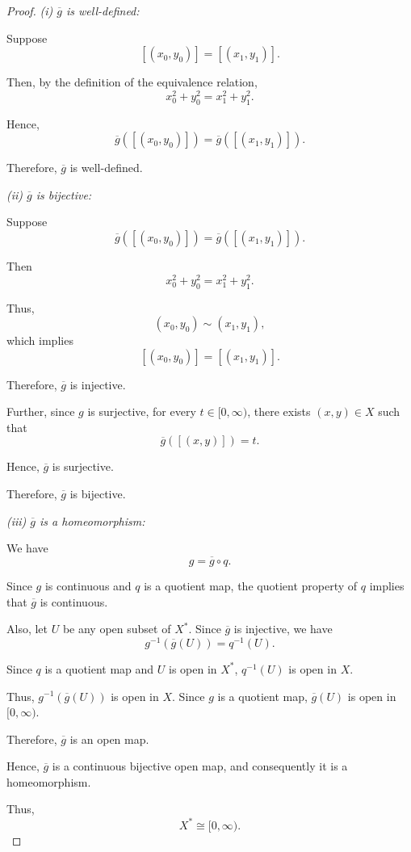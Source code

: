\begin{proof}
\textit{(i) \(\overline{g}\) is well-defined:}

Suppose
\[
[(x_0,y_0)]=[(x_1,y_1)].
\]

Then, by the definition of the equivalence relation,
\[
x_0^2+y_0^2=x_1^2+y_1^2.
\]

Hence,
\[
\overline{g}([(x_0,y_0)])
=
\overline{g}([(x_1,y_1)]).
\]

Therefore, \(\overline{g}\) is well-defined.

\textit{(ii) \(\overline{g}\) is bijective:}

Suppose
\[
\overline{g}([(x_0,y_0)])
=
\overline{g}([(x_1,y_1)]).
\]

Then
\[
x_0^2+y_0^2=x_1^2+y_1^2.
\]

Thus,
\[
(x_0,y_0)\sim(x_1,y_1),
\]
which implies
\[
[(x_0,y_0)]=[(x_1,y_1)].
\]

Therefore, \(\overline{g}\) is injective.

Further, since \(g\) is surjective, for every
\(t\in[0,\infty)\), there exists \((x,y)\in X\)
such that
\[
\overline{g}([(x,y)])=t.
\]

Hence, \(\overline{g}\) is surjective.

Therefore, \(\overline{g}\) is bijective.

\textit{(iii) \(\overline{g}\) is a homeomorphism:}

We have
\[
g=\overline{g}\circ q.
\]

Since \(g\) is continuous and \(q\) is a quotient map,
the quotient property of \(q\) implies that
\(\overline{g}\) is continuous.

Also, let \(U\) be any open subset of \(X^*\).
Since \(\overline{g}\) is injective, we have
\[
g^{-1}(\overline{g}(U))=q^{-1}(U).
\]

Since \(q\) is a quotient map and \(U\) is open in
\(X^*\), \(q^{-1}(U)\) is open in \(X\).

Thus, \(g^{-1}(\overline{g}(U))\) is open in \(X\).
Since \(g\) is a quotient map, \(\overline{g}(U)\)
is open in \([0,\infty)\).

Therefore, \(\overline{g}\) is an open map.

Hence, \(\overline{g}\) is a continuous bijective open
map, and consequently it is a homeomorphism.

Thus,
\[
\boxed{X^*\cong[0,\infty).}
\]

\end{proof}